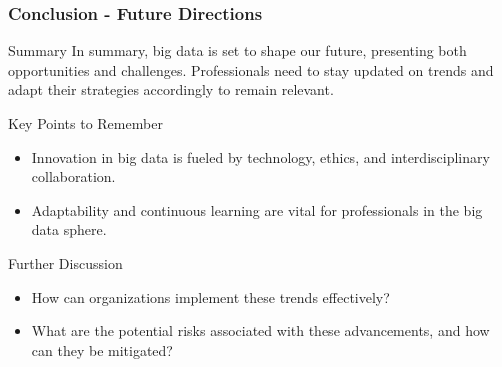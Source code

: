 \documentclass[aspectratio=169]{beamer}
\begin{document}
\begin{frame}[fragile]
    \frametitle{Conclusion - Future Directions}
    \begin{block}{Summary}
        In summary, big data is set to shape our future, presenting both opportunities and challenges. Professionals need to stay updated on trends and adapt their strategies accordingly to remain relevant.
    \end{block}
    
    \begin{block}{Key Points to Remember}
        \begin{itemize}
            \item Innovation in big data is fueled by technology, ethics, and interdisciplinary collaboration.
            \item Adaptability and continuous learning are vital for professionals in the big data sphere.
        \end{itemize}
    \end{block}
    
    \begin{block}{Further Discussion}
        \begin{itemize}
            \item How can organizations implement these trends effectively?
            \item What are the potential risks associated with these advancements, and how can they be mitigated?
        \end{itemize}
    \end{block}
\end{frame}
\end{document}
